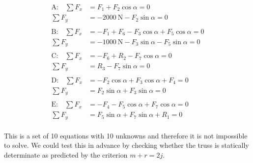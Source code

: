 \documentclass[a4paper,justified,oneside]{tufte-handout}
\numberwithin{equation}{subsection}
\begin{document}
\begin{solution}
\begin{align*}
	\text{A:}\quad	\sum F_x	&=	F_1 + F_2\cos\alpha = 0	\\
					\sum F_y	&=	\SI{-2000}{\N} -F_2\sin\alpha = 0	\\
	\\
	\text{B:}\quad	\sum F_x	&=	-F_1	+F_6	-F_3 \cos\alpha	+F_5\cos\alpha	=0	\\
					\sum F_y	&=	-\SI{1000}{\N}	-F_3\sin\alpha	-F_5\sin\alpha	=0	\\
	\\
	\text{C:}\quad	\sum F_x	&=	-F_6	+R_2	-F_7\cos\alpha	=0	\\
					\sum F_y	&=	R_3	-F_7\sin\alpha	=0	\\
	\\	
	\text{D:}\quad	\sum F_x	&=	-F_2\cos\alpha	+F_3\cos\alpha	+F_4	=0	\\
					\sum F_y	&=	F_2\sin\alpha	+F_3\sin\alpha	=0	\\
	\\
	\text{E:}\quad	\sum F_x	&=	-F_4	-F_5\cos\alpha+F_7\cos\alpha	=0	\\
					\sum F_y	&=	F_5\sin\alpha	+F_7\sin\alpha	+R_1	=0	\\
\end{align*}

This is a set of 10 equations with 10 unknowns and therefore it is not impossible to solve. We could test this in advance by checking whether the truss is statically determinate as predicted by the criterion $m+r=2j$.


\end{solution}
\end{document}

